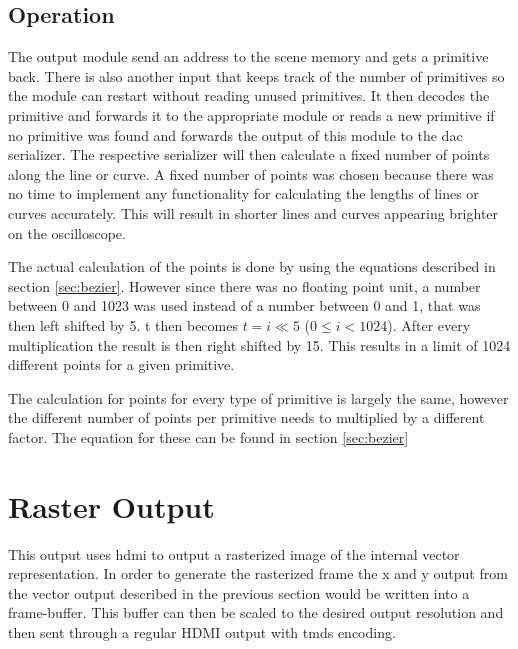 \subsection{Operation}

The output module send an address to the scene memory and gets a primitive back.
There is also another input that keeps track of the number of primitives so the module can restart without reading unused primitives.
It then decodes the primitive and forwards it to the appropriate module or reads a new primitive if no primitive was found and forwards the output of this module to the \gls{dac} serializer.
The respective serializer will then calculate a fixed number of points along the line or curve.
A fixed number of points was chosen because there was no time to implement any functionality for calculating the lengths of lines or curves accurately.
This will result in shorter lines and curves appearing brighter on the oscilloscope.

The actual calculation of the points is done by using the equations described in section \ref{sec:bezier}.
However since there was no floating point unit, a number between 0 and 1023 was used instead of a number between 0 and 1, that was then left shifted by 5.
t then becomes \(t = i \ll 5\) (\(0 \leq i < 1024\)).
After every multiplication the result is then right shifted by 15.
This results in a limit of 1024 different points for a given primitive.

The calculation for points for every type of primitive is largely the same, however the different number of points per primitive needs to multiplied by a different factor.
The equation for these can be found in section \ref{sec:bezier}

\section{Raster Output}

This output uses \gls{hdmi} to output a rasterized image of the internal vector representation.
In order to generate the rasterized frame the x and y output from the vector output described in the previous section would be written into a frame-buffer.
This buffer can then be scaled to the desired output resolution and then sent through a regular HDMI output with \gls{tmds} encoding.